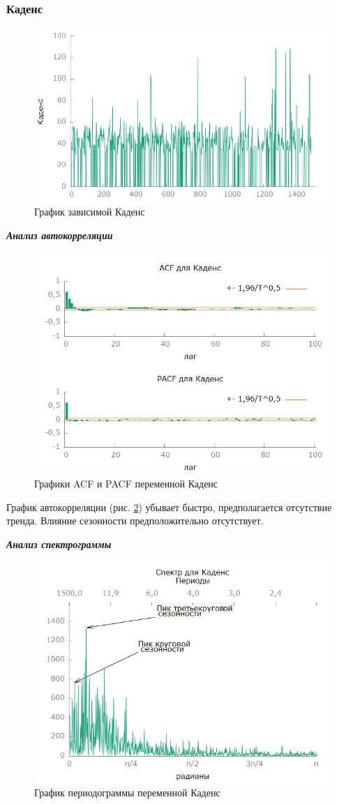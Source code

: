 \documentclass[a4paper,12pt]{article}
\begin{document}
\subsubsection{Каденс}
\begin{figure}[H]
	\centering
	\includegraphics[width=0.7\linewidth]{../[graphics]/cad_graph}
	\caption{График зависимой Каденс}
	\label{fig:cad_graph}
\end{figure}

\textbf{\textit{Анализ автокорреляции}}

\begin{figure}[H]
	\centering
	\includegraphics[width=0.7\linewidth]{../[graphics]/cad_acf_100}
	\caption{Графики ACF и PACF переменной Каденс}
	\label{fig:cad_acf_100}
\end{figure}

График автокорреляции (рис. \ref{fig:cad_acf_100}) убывает быстро, предполагается отсутствие тренда. Влияние сезонности предположительно отсутствует.

\textbf{\textit{Анализ спектрограммы}}

\begin{figure}[H]
	\centering
	\includegraphics[width=0.7\linewidth]{../[graphics]/cad_spectr}
	\caption{График периодограммы переменной Каденс}
	\label{fig:cad_spectr}
\end{figure}
\end{document}
